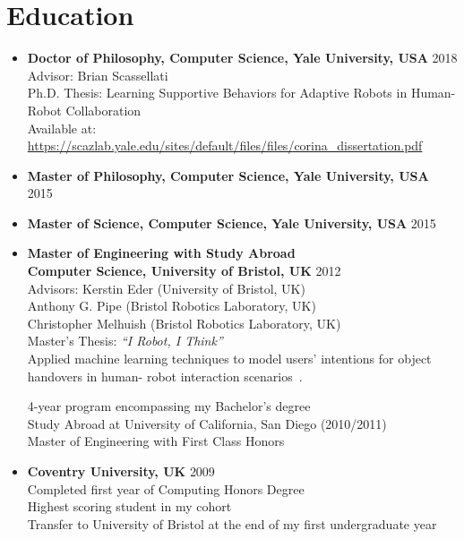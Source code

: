 \documentclass[10pt,letterpaper]{article}
\newcommand{\thing}[2]{{#1} \hfill {#2}}
\begin{document}
\section{Education}
\vspace{-0.5em}
\begin{itemize}%
\item \thing{\bf Doctor of Philosophy, Computer Science, Yale University, USA}{2018}\\
	Advisor: Brian Scassellati\\
	Ph.D. Thesis: Learning Supportive Behaviors for Adaptive Robots in Human-Robot Collaboration \\
	Available at: \href{https://scazlab.yale.edu/sites/default/files/files/corina_dissertation.pdf}{\url{https://scazlab.yale.edu/sites/default/files/files/corina_dissertation.pdf}}
		
\item \thing{\bf Master of Philosophy, Computer Science, Yale University, USA}{2015}
\item \thing{\bf Master of Science, Computer Science, Yale University, USA}{2015}
\item \thing{\bf Master of Engineering with Study Abroad\\Computer Science, University of Bristol, UK}{2012}\\
	Advisors: Kerstin Eder (University of Bristol, UK)\\
	\hphantom{Advisors:} Anthony G. Pipe (Bristol Robotics Laboratory, UK)\\
	\hphantom{Advisors:} Christopher Melhuish (Bristol Robotics Laboratory, UK)\\
	Master's Thesis: {\it ``I Robot, I Think''}\\
	Applied machine learning techniques to model users' intentions for object handovers in human-
robot interaction scenarios~\cite{grigore2013joint}.

	4-year program encompassing my Bachelor's degree\\
	Study Abroad at University of California, San Diego (2010/2011)\\
	Master of Engineering with First Class Honors
\item \thing{\bf Coventry University, UK}{2009}\\
	Completed first year of Computing Honors Degree\\
	Highest scoring student in my cohort\\
	Transfer to University of Bristol at the end of my first undergraduate year
\end{itemize}
\end{document}
